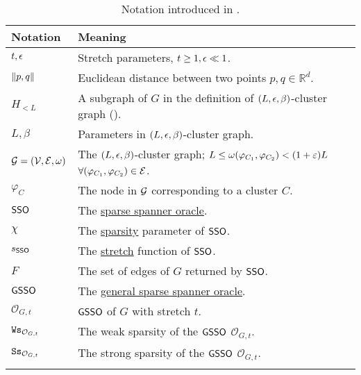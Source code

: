 \renewcommand{\arraystretch}{1.3}
\begin{longtable}{| l | l|} 
	\hline
	\textbf{Notation} & \textbf{Meaning} \\ \hline
	$t,\epsilon$ & Stretch parameters, $t\geq 1, \epsilon \ll 1$.\\ \hline 
	$\nor2{p,q}$ & Euclidean distance between two points $p,q\in \mathbb{R}^d$.\\ \hline 
	$H_{<L}$ & A subgraph of $G$ in the definition of $(L,\epsilon,\beta)$-cluster graph (\Cref{def:ClusterGraph-Param}).\\ \hline 
	$L,\beta$ & Parameters in $(L,\epsilon,\beta)$-cluster graph. \\ \hline 
	$\mathcal{G} = (\mathcal{V},\mathcal{E},\omega)$ &  The $(L,\epsilon,\beta)$-cluster graph;  $L \leq \omega(\varphi_{C_1},\varphi_{C_2}) < (1+\varepsilon)L$  $\forall (\varphi_{C_1},\varphi_{C_2})\in \mathcal{E}$. \\ \hline 
	$\varphi_C$ &  The node in $\mathcal{G}$ corresponding to a cluster $C$.\\ \hline 
	$\mathsf{SSO}$ & The \hyperlink{SPHigh}{sparse spanner oracle}.\\ \hline 
	$\chi$ & The  \hyperlink{Sparsity}{sparsity} parameter of $\mathsf{SSO}$.\\ \hline 
	$s_{\mathsf{SSO}}$ & The  \hyperlink{Stretch}{stretch} function of $\mathsf{SSO}$.\\ \hline 
	$F$ &  The set of edges of $G$ returned by $\mathsf{SSO}$.\\ \hline 
	$\mathsf{GSSO}$ & The \hyperlink{SPHigh}{general sparse spanner oracle}.\\ \hline 
	$\mathcal{O}_{G,t}$ & $\mathsf{GSSO}$ of $G$ with stretch $t$.\\ \hline 
	$\mathtt{Ws}_{\mathcal{O}_{G,t}}$ & The weak sparsity of the $\mathsf{GSSO}$ $\mathcal{O}_{G,t}$.\\ \hline 
	$\mathtt{Ss}_{\mathcal{O}_{G,t}}$ & The strong sparsity of the $\mathsf{GSSO}$ $\mathcal{O}_{G,t}$.\\ \hline 
	\caption{Notation introduced in \Cref{sec:intro}.}
	\label{table:glossray}
\end{longtable}
\renewcommand{\arraystretch}{1}

